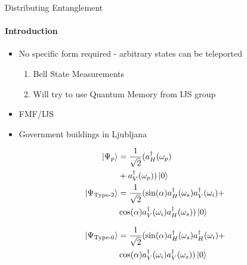 \documentclass[serif,8pt]{beamer}
\begin{document}
\begin{frame}{Distributing Entanglement}
	\framesubtitle{Introduction}
	\begin{itemize}
		\item No specific form required - arbitrary states can be teleported
			\begin{enumerate}
				\item Bell State Measurements
				\item Will try to use Quantum Memory from IJS group
			\end{enumerate}
		\item FMF/IJS
		\item Government buildings in Ljubljana
	\end{itemize}
	\begin{minipage}[l]{0.48\textwidth}
		\begin{equation*}
		\begin{aligned}
			\ket{\Psi_{p}} &= \frac{1}{\sqrt{2}} ( a_{H}^{\dagger} ( \omega_p )\\
						   &+ a_{V}^{\dagger} ( \omega_p ) )\ket{0}\\
			\ket{\Psi_{\text{Type-2}}} &= \frac{1}{\sqrt{2}}(\sin(\alpha)a_{H}^{\dagger}(\omega_s)a_{V}^{\dagger}(\omega_i)+\\
								&\cos(\alpha)a_{V}^{\dagger}(\omega_i)a_{H}^{\dagger}(\omega_s))\ket{0}\\
		\end{aligned}
		\end{equation*}
	\end{minipage}
	\begin{minipage}[r]{0.48\textwidth}
	\begin{equation*}
		\begin{aligned}
			\ket{\Psi_{\text{Type-0}}} &= \frac{1}{\sqrt{2}}(\sin(\alpha)a_{H}^{\dagger}(\omega_s)a_{H}^{\dagger}(\omega_i)+\\
									   &\cos(\alpha)a_{V}^{\dagger}(\omega_i)a_{V}^{\dagger}(\omega_s))\ket{0}
		\end{aligned}
	\end{equation*}
	\end{minipage}
\end{frame}
\end{document}
